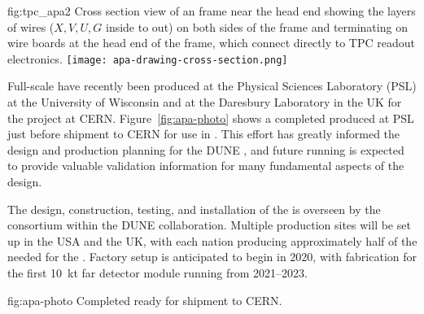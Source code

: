 \begin{dunefigure}{fig:tpc_apa2}
{Cross section view of an  frame near the head end showing the layers of wires ($X,V,U,G$ inside to out) on both sides of the frame and terminating on wire boards at the head end of the frame, which connect directly to TPC readout electronics.} 
\texttt{[image: apa-drawing-cross-section.png]} 
\end{dunefigure} 

Full-scale  have recently been produced at the Physical Sciences Laboratory (PSL) at the University of Wisconsin and at the Daresbury Laboratory in the UK for the  project at CERN. Figure~\ref{fig:apa-photo} shows a completed  produced at PSL just before shipment to CERN for use in . This effort has greatly informed the design and production planning for the DUNE , and future  running is expected to provide valuable validation information for many fundamental aspects of the   design. 

The design, construction, testing, and installation of the  is overseen by the  consortium within the DUNE collaboration. Multiple  production sites will be set up in the USA and the UK, with each nation producing approximately half of the  needed for the %
.  Factory setup is anticipated to begin in 2020, with  fabrication for the first \SI{10}{kt} far detector module running from 2021--2023.  

\begin{dunefigure}{fig:apa-photo}
{Completed   ready for shipment to CERN.}
\setlength{\fboxsep}{0pt}
\setlength{\fboxrule}{0.5pt}
\end{dunefigure}
